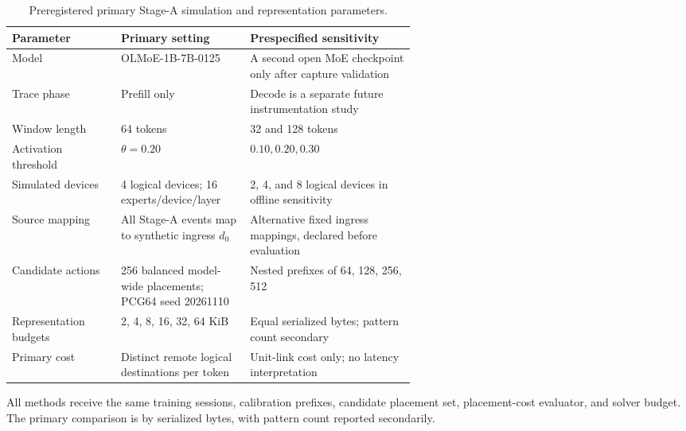 \documentclass[a4paper,preprint,review,12pt,authoryear]{elsarticle}
\begin{document}
\begin{table}[t]
\centering
\small
\caption{Preregistered primary Stage-A simulation and representation parameters.}
\label{tab:defaults}
\begin{tabularx}{\linewidth}{p{0.27\linewidth}p{0.32\linewidth}X}
\toprule
Parameter & Primary setting & Prespecified sensitivity \\
\midrule
Model & OLMoE-1B-7B-0125 & A second open MoE checkpoint only after capture validation \\
Trace phase & Prefill only & Decode is a separate future instrumentation study \\
Window length & 64 tokens & 32 and 128 tokens \\
Activation threshold & $\theta=0.20$ & $0.10, 0.20, 0.30$ \\
Simulated devices & 4 logical devices; 16 experts/device/layer & 2, 4, and 8 logical devices in offline sensitivity \\
Source mapping & All Stage-A events map to synthetic ingress $d_0$ & Alternative fixed ingress mappings, declared before evaluation \\
Candidate actions & 256 balanced model-wide placements; PCG64 seed 20261110 & Nested prefixes of 64, 128, 256, 512 \\
Representation budgets & 2, 4, 8, 16, 32, 64 KiB & Equal serialized bytes; pattern count secondary \\
Primary cost & Distinct remote logical destinations per token & Unit-link cost only; no latency interpretation \\
\bottomrule
\end{tabularx}
\end{table}

All methods receive the same training sessions, calibration prefixes, candidate placement set, placement-cost evaluator, and solver budget. The primary comparison is by serialized bytes, with pattern count reported secondarily.
\end{document}
